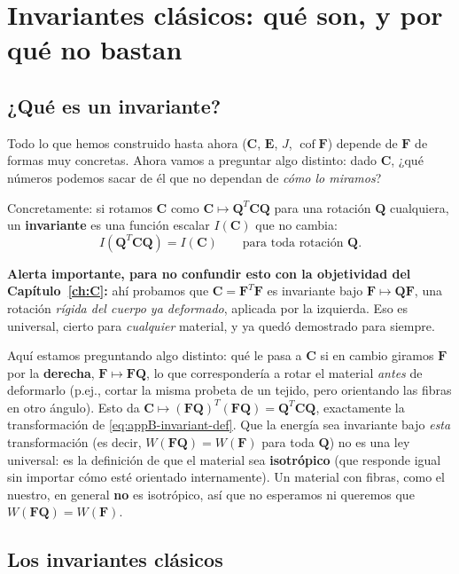 \documentclass[11pt,a4paper]{article}
\newcommand{\Cof}{\operatorname{cof}}
\begin{document}
\section{Invariantes cl\'asicos: qu\'e son, y por qu\'e no bastan}
\label{ch:invariants}

\subsection{¿Qu\'e es un invariante?}

Todo lo que hemos construido hasta ahora ($\bm C$, $\bm E$, $J$,
$\Cof\bm F$) depende de $\bm F$ de formas muy concretas. Ahora vamos a
preguntar algo distinto: dado $\bm C$, ¿qu\'e n\'umeros podemos sacar
de \'el que no dependan de \emph{c\'omo lo miramos}?

Concretamente: si rotamos $\bm C$ como
$\bm C\mapsto\bm Q^T\bm C\bm Q$ para una rotaci\'on $\bm Q$
cualquiera, un \textbf{invariante} es una funci\'on escalar $I(\bm C)$
que no cambia:
\begin{equation}
 I(\bm Q^T\bm C\bm Q)=I(\bm C)\qquad\text{para toda rotaci\'on }\bm Q.
 \label{eq:appB-invariant-def}
\end{equation}

\textbf{Alerta importante, para no confundir esto con la
objetividad del Cap\'itulo~\ref{ch:C}:} ah\'i probamos que
$\bm C=\bm F^T\bm F$ es invariante bajo $\bm F\mapsto\bm Q\bm F$,
una rotaci\'on \emph{r\'igida del cuerpo ya deformado}, aplicada por
la izquierda. Eso es universal, cierto para \emph{cualquier} material,
y ya qued\'o demostrado para siempre.

Aqu\'i estamos preguntando algo distinto: qu\'e le pasa a $\bm C$ si en
cambio giramos $\bm F$ por la \textbf{derecha}, $\bm F\mapsto\bm F\bm Q$,
lo que corresponder\'ia a rotar el material \emph{antes} de
deformarlo (p.ej., cortar la misma probeta de un tejido, pero
orientando las fibras en otro \'angulo). Esto da
$\bm C\mapsto(\bm F\bm Q)^T(\bm F\bm Q)=\bm Q^T\bm C\bm Q$, exactamente
la transformaci\'on de \eqref{eq:appB-invariant-def}. Que la energ\'ia
sea invariante bajo \emph{esta} transformaci\'on
(es decir, $W(\bm F\bm Q)=W(\bm F)$ para toda $\bm Q$) no es una ley
universal: es la definici\'on de que el material sea
\textbf{isotr\'opico} (que responde igual sin importar c\'omo est\'e
orientado internamente). Un material con fibras, como el nuestro, en
general \textbf{no} es isotr\'opico, as\'i que no esperamos ni
queremos que $W(\bm F\bm Q)=W(\bm F)$.

\subsection{Los invariantes cl\'asicos}
\end{document}

